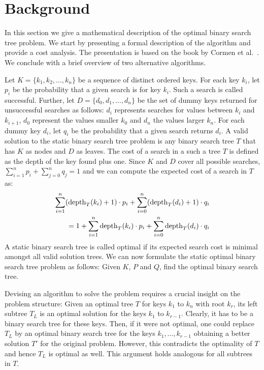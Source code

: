 \section{Background}

In this section we give a mathematical description of the optimal binary
search tree problem. We start by presenting a formal description of the
algorithm and provide a cost analysis. The presentation is based on the book by
Cormen et al.~\cite{MITBook}. We conclude with a brief overview of two
alternative algorithms.

 Let $K = \{k_1, k_2, \dots, k_n\}$ be a sequence
of distinct ordered keys. For each key $k_i$, let $p_i$ be the probability
that a given search is for key $k_i$. Such a search is called successful.
Further, let $D = \{d_0, d_1, \dots, d_n\}$ be the set of dummy keys
returned for unsuccessful searches as follows: $d_i$ represents searches
for values between $k_i$ and $k_{i+1}$, $d_0$ represent the values smaller
$k_0$ and $d_n$ the values larger $k_n$. For each dummy key $d_i$, let
$q_i$ be the probability that a given search returns $d_i$.
A valid solution to the static binary search tree problem is any binary
search tree $T$ that has $K$ as nodes and $D$ as leaves.
The cost of a search in a such a tree $T$ is defined as the depth of the key
found plus one. Since $K$ and $D$ cover all possible searches,
$\sum_{i=1}^n p_i + \sum_{j=0}^n q_j = 1$ and we can compute the expected
cost of a search in $T$ as:
\begin{align}
  \sum_{i=1}^n (\operatorname{depth}_T(k_i) + 1) \cdot p_i
   + \sum_{i=0}^n (\operatorname{depth}_T(d_i) + 1) \cdot q_i
  \nonumber\\
  = 1 + \sum_{i=1}^n \operatorname{depth}_T(k_i) \cdot p_i
      + \sum_{i=0}^n \operatorname{depth}_T(d_i) \cdot q_i
  \label{eqn:cost}
\end{align}
A static binary search tree is called optimal if its expected search cost
is minimal amongst all valid solution trees.
We can now formulate the static optimal binary search tree problem as
follows: Given $K$, $P$ and $Q$, find the optimal binary search tree.

 Devising an algorithm to solve the problem requires a
crucial insight on the problem structure: Given an optimal tree $T$ for
keys $k_1$ to $k_n$ with root $k_r$, its left subtree $T_L$ is an optimal
solution for the keys $k_1$ to $k_{r-1}$. Clearly, it has to be a binary
search tree for these keys. Then, if it were not optimal, one could replace
$T_L$ by an optimal binary search tree for the keys $k_1,\dots,k_{r-1}$
obtaining a better solution $T'$ for the original problem. However, this
contradicts the optimality of $T$ and hence $T_L$ is optimal as well. This
argument holds analogous for all subtrees in $T$.

